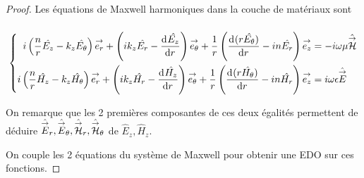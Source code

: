   \begin{proof}

    Les équations de Maxwell harmoniques dans la couche de matériaux sont

    \begin{equation*}
    \end{equation*}
    \begin{equation*}
    \left\lbrace \begin{aligned}
      i\left(\frac{n}{r}\hat{E_z} - k_z\hat{E_\theta}\right)\vect{e_r} +
      \left(ik_z\hat{E_r} - \ddp{r}{\hat{E_z}}\right)\vect{e_\theta} +
      \frac{1}{r}\left(\ddp{r}{(r\hat{E_\theta})}-in\hat{E_r}\right)\vect{e_z}
      &=-i\w\mu \hat \vH
      \\
      i\left(\frac{n}{r}\hat{H_z} - k_z\hat{H_\theta}\right)\vect{e_r} +
      \left(ik_z\hat{H_r} - \ddp{r}{\hat{H_z}}\right)\vect{e_\theta} +
      \frac{1}{r}\left(\ddp{r}{(r\hat{H_\theta})}-in\hat{H_r}\right)\vect{e_z}
      &=i\w\eps \hat \vE
    \end{aligned}\right.
    \end{equation*}    %

    On remarque que les 2 premières composantes de ces deux égalités permettent de déduire \(\hat\vE_r,\hat\vE_\theta, \hat\vH_r,\hat\vH_\theta\) de \(\hat E_z,\hat H_z\).

    On couple les 2 équations du système de Maxwell pour obtenir une EDO sur ces fonctions.




\end{proof}
